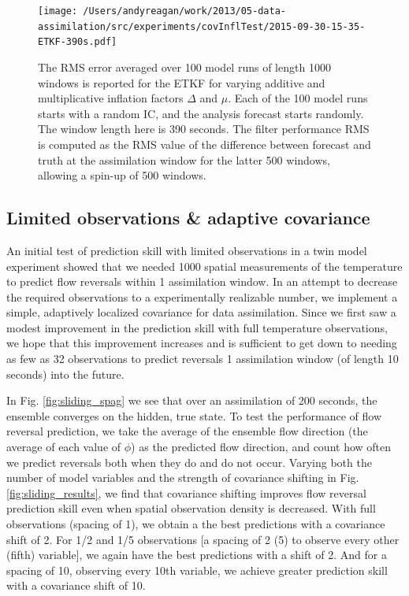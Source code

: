 \begin{figure}[h]
  \centering
  \texttt{[image: /Users/andyreagan/work/2013/05-data-assimilation/src/experiments/covInflTest/2015-09-30-15-35-ETKF-390s.pdf]}
  \caption[The RMS error averaged over 100 model runs of length 1000 windows is reported for the ETKF for varying additive and multiplicative inflation factors]{
    The RMS error averaged over 100 model runs of length 1000 windows is reported for the ETKF for varying additive and multiplicative inflation factors $\Delta$ and $\mu$.
    Each of the 100 model runs starts with a random IC, and the analysis forecast starts randomly.
    The window length here is 390 seconds.
    The filter performance RMS is computed as the RMS value of the difference between forecast and truth at the assimilation window for the latter 500 windows, allowing a spin-up of 500 windows.
  }
  \label{fig:ETKF_cov_tuning_390s}
\end{figure}

\subsection{Limited observations \& adaptive covariance}

An initial test of prediction skill with limited observations in a twin model experiment showed that we needed 1000 spatial measurements of the temperature to predict flow reversals within 1 assimilation window.
In an attempt to decrease the required observations to a experimentally realizable number, we implement a simple, adaptively localized covariance for data assimilation.
Since we first saw a modest improvement in the prediction skill with full temperature observations, we hope that this improvement increases and is sufficient to get down to needing as few as 32 observations to predict reversals 1 assimilation window (of length 10 seconds) into the future.

In Fig. \ref{fig:sliding_spag} we see that over an assimilation of 200 seconds, the ensemble converges on the hidden, true state.
To test the performance of flow reversal prediction, we take the average of the ensemble flow direction (the average of each value of $\phi$) as the predicted flow direction, and count how often we predict reversals both when they do and do not occur.
Varying both the number of model variables and the strength of covariance shifting in Fig. \ref{fig:sliding_results}, we find that covariance shifting improves flow reversal prediction skill even when spatial observation density is decreased.
With full observations (spacing of 1), we obtain a the best predictions with a covariance shift of 2.
For 1/2 and 1/5 observations [a spacing of 2 (5) to observe every other (fifth) variable], we again have the best predictions with a shift of 2.
And for a spacing of 10, observing every 10th variable, we achieve greater prediction skill with a covariance shift of 10.

